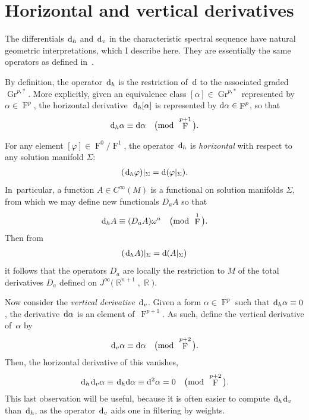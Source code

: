 \documentclass[pdftex]{sigma}
\DeclareMathOperator{\R}{\mathbb{R}}
\DeclareMathOperator{\Gr}{Gr}
\renewcommand{\d}{{\rm d}}
\renewcommand{\mod}[1]{\quad\big(\mathrm{mod\enspace} #1\big)}
\DeclareMathOperator{\pwf}{F}
\renewcommand{\dh}{\ensuremath{\hspace{1pt} \d_h}}
\newcommand{\dv}{\ensuremath{\hspace{1pt} \d_v}}
\newcommand{\cMinfty}{C^\infty(M)}
\numberwithin{equation}{section}
\begin{document}
\section{Horizontal and vertical derivatives}\label{sec:dv and dh}

The differentials $\dh$ and $\dv$ in the characteristic spectral sequence have natural geometric interpretations, which I describe here. They are essentially the same operators as defined in~\cite{Characteristic_Cohomology_I}.

By definition, the operator $\dh$ is the restriction of~$\d$ to the associated graded $\Gr^{p,*}$. More expli\-ci\-tly, given an equivalence class $[\alpha] \in \Gr^{p,*}$ represented by $\alpha \in \pwf^p$, the horizontal derivative~$\dh[\alpha]$ is represented by $\d\alpha \in \pwf^p$, so that
\begin{gather*}
\dh\alpha \equiv \d\alpha \mod{\pwf^{p+1}} .
\end{gather*}

For any element $[\varphi] \in \pwf^0/\pwf^1$, the operator $\dh$ is \emph{horizontal} with respect to any solution manifold $\Sigma$:
\begin{gather*}
(\dh \varphi)|_\Sigma = \d(\varphi|_\Sigma) .
\end{gather*}
In~particular, a function $A \in \cMinfty$ is a functional on solution manifolds $\Sigma$, from which we may define new functionals $D_a A$ so that
\begin{gather*}
\dh A \equiv (D_a A) \omega^a \mod{\pwf^1} .
\end{gather*}
Then from
\begin{gather*}
(\dh A)|_\Sigma = \d(A|_\Sigma)
\end{gather*}
it follows that the operators $D_a$ are locally the restriction to $M$ of the total derivatives $D_a$ defined on $J^\infty\big(\R^{n+1},\R\big)$.

Now consider the \emph{vertical derivative} $\dv$. Given a form $\alpha \in \pwf^{p}$ such that $\dh\alpha \equiv 0$, the deriva\-tive~$\d\alpha$ is an element of~$\pwf^{p+1}$. As such, define the vertical derivative of~$\alpha$ by
\begin{gather*}
\dv\alpha \equiv \d\alpha \mod{\pwf^{p+2}} .
\end{gather*}
Then, the horizontal derivative of this vanishes,
\begin{gather*}
\dh\dv\alpha \equiv \dh\d\alpha \equiv \d^2\alpha = 0 \mod{\pwf^{p+2}} .
\end{gather*}
This last observation will be useful, because it is often easier to compute $\dh\dv$ than $\dh$, as the operator $\dv$ aids one in filtering by weights.
\end{document}
